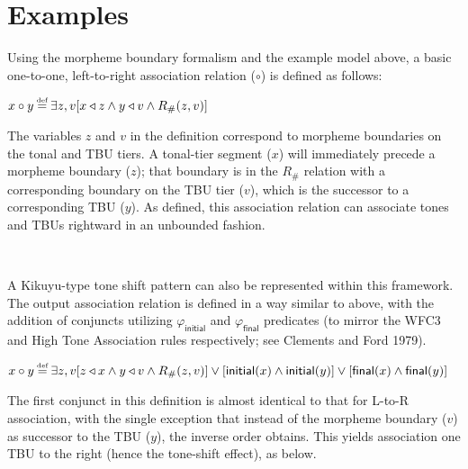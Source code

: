 \documentclass{article}
\newcommand\myeq{\mathrel{\stackrel{\makebox[0pt]{\mbox{\normalfont\tiny def}}}{=}}}
\begin{document}
\section{Examples}
Using the morpheme boundary formalism and the example model above, a basic one-to-one, left-to-right association relation ($\circ$) is defined as follows:
\begin{center}
$x \circ y \myeq  \exists z, v[x \triangleleft z  \wedge  y \triangleleft v  \wedge  R_{\#}(z, v)]$
\end{center}
The variables $z$ and $v$ in the definition correspond to morpheme boundaries on the tonal and TBU tiers. A tonal-tier segment ($x$) will immediately precede a morpheme boundary ($z$); that boundary is in the $R_{\#}$ relation with a corresponding boundary on the TBU tier ($v$), which is the successor to a corresponding TBU ($y$). As defined, this association relation can associate tones and TBUs rightward in an unbounded fashion.
\begin{center}
\\
\end{center}
A Kikuyu-type tone shift pattern can also be represented within this framework. The output association relation is defined in a way similar to above, with the addition of conjuncts utilizing $\varphi_{\mathsf{initial}}$ and $\varphi_{\mathsf{final}}$ predicates (to mirror the WFC3 and High Tone Association rules respectively; see Clements and Ford 1979).
\begin{center}
$x \circ y \myeq \exists z, v[z \triangleleft x  \wedge  y \triangleleft v  \wedge  R_{\#}(z, v)] \lor [\mathsf{initial}(x) \wedge \mathsf{initial}(y)] \lor [\mathsf{final}(x) \wedge \mathsf{final}(y)]$
\end{center}
The first conjunct in this definition is almost identical to that for L-to-R association, with the single exception that instead of the morpheme boundary ($v$) as successor to the TBU ($y$), the inverse order obtains. This yields association one TBU to the right (hence the tone-shift effect), as below.
\end{document}
